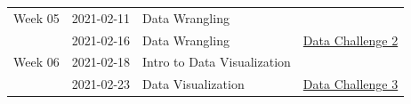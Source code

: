 \documentclass[
]{book}
\begin{document}
\begin{longtable}[]{@{}llll@{}}
\begin{minipage}[t]{0.22\columnwidth}\raggedright
Week 05\strut
\end{minipage} & \begin{minipage}[t]{0.22\columnwidth}\raggedright
2021-02-11\strut
\end{minipage} & \begin{minipage}[t]{0.22\columnwidth}\raggedright
Data Wrangling\strut
\end{minipage} & \begin{minipage}[t]{0.22\columnwidth}\raggedright
\strut
\end{minipage}\tabularnewline
\begin{minipage}[t]{0.22\columnwidth}\raggedright
\strut
\end{minipage} & \begin{minipage}[t]{0.22\columnwidth}\raggedright
2021-02-16\strut
\end{minipage} & \begin{minipage}[t]{0.22\columnwidth}\raggedright
Data Wrangling\strut
\end{minipage} & \begin{minipage}[t]{0.22\columnwidth}\raggedright
\href{}{Data Challenge 2}\strut
\end{minipage}\tabularnewline
\begin{minipage}[t]{0.22\columnwidth}\raggedright
Week 06\strut
\end{minipage} & \begin{minipage}[t]{0.22\columnwidth}\raggedright
2021-02-18\strut
\end{minipage} & \begin{minipage}[t]{0.22\columnwidth}\raggedright
Intro to Data Visualization\strut
\end{minipage} & \begin{minipage}[t]{0.22\columnwidth}\raggedright
\strut
\end{minipage}\tabularnewline
\begin{minipage}[t]{0.22\columnwidth}\raggedright
\strut
\end{minipage} & \begin{minipage}[t]{0.22\columnwidth}\raggedright
2021-02-23\strut
\end{minipage} & \begin{minipage}[t]{0.22\columnwidth}\raggedright
Data Visualization\strut
\end{minipage} & \begin{minipage}[t]{0.22\columnwidth}\raggedright
\href{}{Data Challenge 3}\strut

\end{minipage}
\end{longtable}
\end{document}
